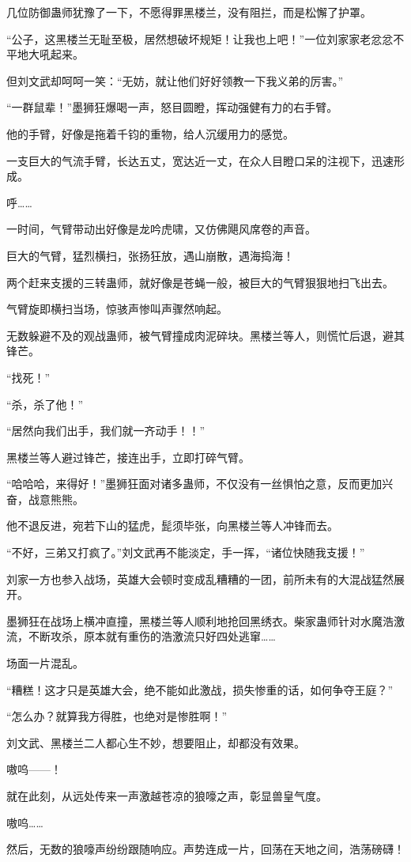 \begin{this_body}
几位防御蛊师犹豫了一下，不愿得罪黑楼兰，没有阻拦，而是松懈了护罩。

“公子，这黑楼兰无耻至极，居然想破坏规矩！让我也上吧！”一位刘家家老忿忿不平地大吼起来。

但刘文武却呵呵一笑：“无妨，就让他们好好领教一下我义弟的厉害。”

“一群鼠辈！”墨狮狂爆喝一声，怒目圆瞪，挥动强健有力的右手臂。

他的手臂，好像是拖着千钧的重物，给人沉缓用力的感觉。

一支巨大的气流手臂，长达五丈，宽达近一丈，在众人目瞪口呆的注视下，迅速形成。

呼……

一时间，气臂带动出好像是龙吟虎啸，又仿佛飓风席卷的声音。

巨大的气臂，猛烈横扫，张扬狂放，遇山崩散，遇海捣海！

两个赶来支援的三转蛊师，就好像是苍蝇一般，被巨大的气臂狠狠地扫飞出去。

气臂旋即横扫当场，惊骇声惨叫声骤然响起。

无数躲避不及的观战蛊师，被气臂撞成肉泥碎块。黑楼兰等人，则慌忙后退，避其锋芒。

“找死！”

“杀，杀了他！”

“居然向我们出手，我们就一齐动手！！”

黑楼兰等人避过锋芒，接连出手，立即打碎气臂。

“哈哈哈，来得好！”墨狮狂面对诸多蛊师，不仅没有一丝惧怕之意，反而更加兴奋，战意熊熊。

他不退反进，宛若下山的猛虎，髭须毕张，向黑楼兰等人冲锋而去。

“不好，三弟又打疯了。”刘文武再不能淡定，手一挥，“诸位快随我支援！”

刘家一方也参入战场，英雄大会顿时变成乱糟糟的一团，前所未有的大混战猛然展开。

墨狮狂在战场上横冲直撞，黑楼兰等人顺利地抢回黑绣衣。柴家蛊师针对水魔浩激流，不断攻杀，原本就有重伤的浩激流只好四处逃窜……

场面一片混乱。

“糟糕！这才只是英雄大会，绝不能如此激战，损失惨重的话，如何争夺王庭？”

“怎么办？就算我方得胜，也绝对是惨胜啊！”

刘文武、黑楼兰二人都心生不妙，想要阻止，却都没有效果。

嗷呜——！

就在此刻，从远处传来一声激越苍凉的狼嚎之声，彰显兽皇气度。

嗷呜……

然后，无数的狼嚎声纷纷跟随响应。声势连成一片，回荡在天地之间，浩荡磅礴！

\end{this_body}

